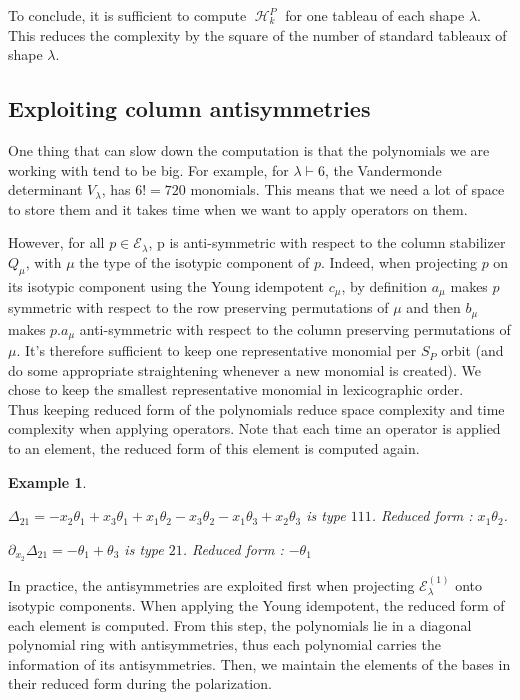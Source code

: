 \documentclass[letter,12pt]{article}
\newcommand{\pauline}[1]{\todo[linecolor=blue,backgroundcolor=blue!25,bordercolor=blue]{#1}}
\DeclareMathOperator{\harmonics}{\mathcal{H}}
\newtheorem{example}{Example}
\begin{document}
	To conclude, it is sufficient to compute $\harmonics_k^P$ for one tableau of each shape $\lambda$. This reduces the complexity by the square of the number of standard tableaux of shape $\lambda$.
	
	\subsection{Exploiting column antisymmetries}
	
	One thing that can slow down the computation is that the polynomials we are working with tend to be big. For example, for $\lambda \vdash 6$, the Vandermonde determinant $V_\lambda$, has $6!=720$ monomials. This means that we need a lot of space to store them and it takes time when we want to apply operators on them. 
	
	However, for all $p \in \mathcal{E}_\lambda$, p is anti-symmetric with respect to the column stabilizer $Q_\mu$, with $\mu$ the type of the isotypic component of $p$. Indeed, when projecting $p$ on its isotypic component using the Young idempotent $c_\mu$, by definition $a_\mu$ makes $p$ symmetric with respect to the row preserving permutations of $\mu$ and then $b_\mu$ makes $p.a_\mu$ anti-symmetric with respect to the column preserving permutations of $\mu$. 
	It's therefore sufficient to keep one representative monomial per $S_P$ orbit \pauline{$S_P$ orbit?} (and do some appropriate straightening whenever a new monomial is created). We chose to keep the smallest representative monomial in lexicographic order. \\
	
	Thus keeping reduced form of the polynomials reduce space complexity and time complexity when applying operators. Note that each time an operator is applied to an element, the reduced form of this element is computed again. 
	
	\begin{example} ~
		
		$\Delta_{21} = -x_{2} \theta_{1} + x_{3} \theta_{1} + x_{1} \theta_{2} - x_{3} \theta_{2} - x_{1} \theta_{3} + x_{2} \theta_{3}$ is type $111$.
		Reduced form : $x_1\theta_2$.
		
		$\partial_{x_2}\Delta_{21} = -\theta_1 + \theta_3$ is type $21$. 
		Reduced form : $-\theta_1$ 
	\end{example}

	In practice, the antisymmetries are exploited first when projecting $\mathcal{E}_\lambda^{(1)}$ onto isotypic components. When applying the Young idempotent, the reduced form of each element is computed. From this step, the polynomials lie in a diagonal polynomial ring with antisymmetries, thus each polynomial carries the information of its antisymmetries.  
	Then, we maintain the elements of the bases in their reduced form during the polarization. 
\end{document}
